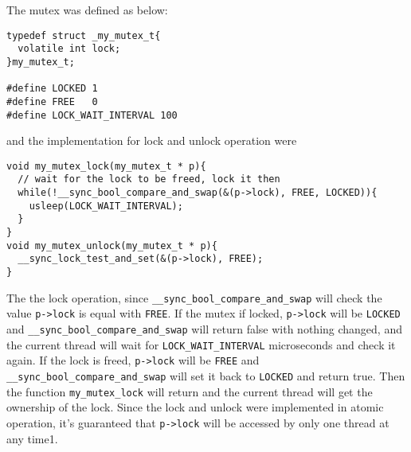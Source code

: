 \documentclass[12pt]{article}
\begin{document}
The mutex was defined as below:
\begin{verbatim}
typedef struct _my_mutex_t{
  volatile int lock;
}my_mutex_t;

#define LOCKED 1
#define FREE   0
#define LOCK_WAIT_INTERVAL 100
\end{verbatim}
and the implementation for lock and unlock operation were
\begin{verbatim}
void my_mutex_lock(my_mutex_t * p){
  // wait for the lock to be freed, lock it then
  while(!__sync_bool_compare_and_swap(&(p->lock), FREE, LOCKED)){
    usleep(LOCK_WAIT_INTERVAL);
  }
}
void my_mutex_unlock(my_mutex_t * p){
  __sync_lock_test_and_set(&(p->lock), FREE);
}
\end{verbatim}
The the lock operation, since \texttt{\_\_sync\_bool\_compare\_and\_swap} 
will check the value \texttt{p->lock} is equal with \texttt{FREE}. 
If the mutex if locked, \texttt{p->lock} will be \texttt{LOCKED} and
\texttt{\_\_sync\_bool\_compare\_and\_swap} will return false with nothing
changed, and the current thread will wait for \texttt{LOCK\_WAIT\_INTERVAL}
microseconds and check it again. If the lock is freed, \texttt{p->lock} 
will be \texttt{FREE} and \texttt{\_\_sync\_bool\_compare\_and\_swap} will 
set it back to \texttt{LOCKED} and return true. Then the function
\texttt{my\_mutex\_lock} will return and the current thread will get the 
ownership of the lock. Since the lock and unlock were implemented in atomic 
operation, it's guaranteed that \texttt{p->lock} will be accessed by only one
thread at any time1.
\end{document}
